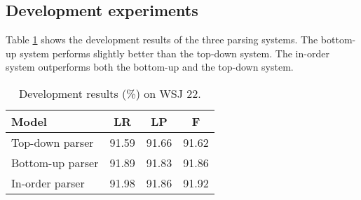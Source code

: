\documentclass[11pt,letterpaper]{article}
\begin{document}
\subsection{Development experiments}
Table \ref{dev} shows the development results of the three parsing systems.
The bottom-up system performs slightly better than the top-down system.
The in-order system outperforms both the bottom-up and the top-down system.
\begin{table}[!tp]
\begin{center}
\renewcommand{\arraystretch}{0.8}
\begin{tabular}{>{\small}l|>{\small}c|>{\small}c|>{\small}c}
\hline
Model &  LR & LP & F \\
\hline
\hline
Top-down parser & 91.59 & 91.66 & 91.62\\
Bottom-up parser & 91.89 & 91.83 & 91.86\\
In-order parser & 91.98 & 91.86 & 91.92\\
\hline 
\end{tabular}
\end{center}
\caption{\label{dev}  Development results (\%) on WSJ 22.}
\end{table}
\end{document}
